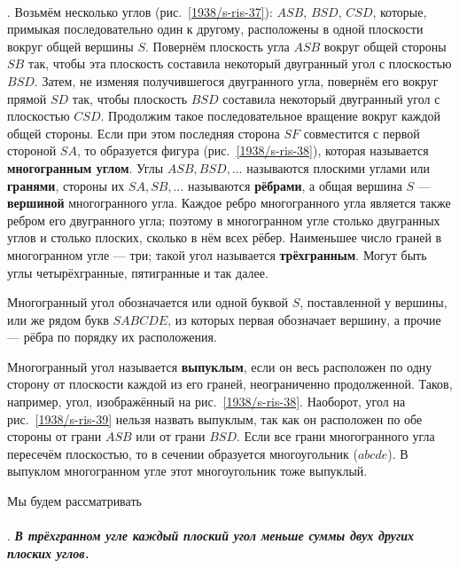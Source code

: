 \paragraph{}\label{1938/s49}
\mbox{.}
Возьмём несколько углов (рис.~\ref{1938/s-ris-37}): $ASB$, $BSD$, $CSD$, которые, примыкая последовательно один к другому, расположены в одной плоскости вокруг общей вершины $S$.
Повернём плоскость угла $ASB$ вокруг общей стороны $SB$ так, чтобы эта плоскость составила некоторый двугранный угол с плоскостью $BSD$.
Затем, не изменяя получившегося двугранного угла, повернём его вокруг прямой $SD$ так, чтобы плоскость $BSD$ составила некоторый двугранный угол с плоскостью $CSD$.
Продолжим такое последовательное вращение вокруг каждой общей стороны.
Если при этом последняя сторона $SF$ совместится с первой стороной $SA$, то образуется фигура (рис.~\ref{1938/s-ris-38}), которая называется \textbf{многогранным углом}.
Углы $ASB, BSD,\dots$ называются плоскими углами или \textbf{гранями}, стороны их $SA, SB,\dots$ называются \textbf{рёбрами}, а общая вершина $S$ — \textbf{вершиной} многогранного угла.
Каждое ребро многогранного угла является также ребром его двугранного угла;
поэтому в многогранном угле столько двугранных углов и столько плоских, сколько в нём всех рёбер.
Наименьшее число граней в многогранном угле — три;
такой угол называется \textbf{трёхгранным}.
Могут быть углы четырёхгранные, пятигранные и так далее.

Многогранный угол обозначается или одной буквой $S$, поставленной у вершины, или же рядом букв $SABCDE$, из которых первая обозначает вершину, а прочие — рёбра по порядку их расположения.

Многогранный угол называется \textbf{выпуклым}, если он весь расположен по одну сторону от плоскости каждой из его граней, неограниченно продолженной.
Таков, например, угол, изображённый на рис.~\ref{1938/s-ris-38}.
Наоборот, угол на рис.~\ref{1938/s-ris-39} нельзя назвать выпуклым, так как он расположен по обе стороны от грани $ASB$ или от грани $BSD$.
Если все грани многогранного угла пересечём плоскостью, то в сечении образуется многоугольник ($abcde$).
В выпуклом многогранном угле этот многоугольник тоже выпуклый.

Мы будем рассматривать 

\paragraph{}\label{1938/s50}
.
\textbf{\emph{В трёхгранном угле каждый плоский угол меньше суммы двух других плоских углов.}}

